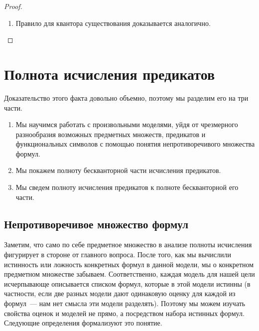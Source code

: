 \documentclass[a4paper,11pt]{article}
\theoremstyle{definition}
\newcommand{\sem}[2]{\llbracket #1 \rrbracket^{#2}}
\newcommand{\True}{\text{И}}
\newcommand{\False}{\text{Л}}
\begin{document}
\begin{proof}
\begin{enumerate}
  Опять же, фиксируем некоторую оценку. Нам нужно показать, что $\forall
  x\,\psi$ не бывает ложным, если $\varphi$ истинно.

  По предположению индукции мы знаем, что $\llbracket\varphi \to \psi\rrbracket =
  \True$. Пусть $\llbracket\forall x\,\psi\rrbracket = \False$. То есть, найдётся
  такой $v_x$ из $D$, что $\sem{\psi}{x:=v_x} = \False$. Но заметим, что $x$ не
  входит свободно в $\varphi$. Значит, $\sem{\varphi}{x:=v_x} = \True$. Значит,
  $\sem{\varphi \to \psi}{x:=v_x} = \False$. Противоречие с общезначимостью
  $\gamma_j$.
\item Правило для квантора существования доказывается аналогично.
\end{enumerate}
\end{proof}

\section{Полнота исчисления предикатов}
Доказательство этого факта довольно объемно, поэтому мы разделим его на три
части.
\begin{enumerate}
\item Мы научимся работать с произвольными моделями, уйдя от чрезмерного
  разнообразия возможных предметных множеств, предикатов и функциональных
  символов с помощью понятия непротиворечивого множества формул.
\item Мы покажем полноту бескванторной части исчисления предикатов.
\item Мы сведем полноту исчисления предикатов к полноте бескванторной его
  части.
\end{enumerate}

\subsection{Непротиворечивое множество формул}
Заметим, что само по себе предметное множество в анализе полноты исчисления
фигурирует в стороне от главного вопроса. После того, как мы вычислили
истинность или ложность конкретных формул в данной модели, мы о конкретном
предметном множестве забываем. Соответственно, каждая модель для нашей цели
исчерпывающе описывается списком формул, которые в этой модели истинны (в
частности, если две разных модели дают одинаковую оценку для каждой из формул~---
нам нет смысла эти модели разделять). Поэтому мы можем изучать свойства оценок и
моделей не прямо, а посредством набора истинных формул. Следующие определения
формализуют это понятие.
\end{document}
